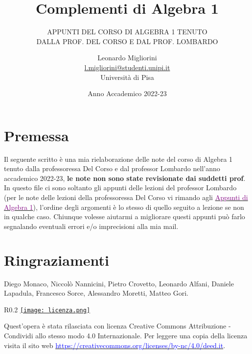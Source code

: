 \documentclass[11pt]{scrartcl}
\begin{document}
\title{Complementi di Algebra 1}
\subtitle{\large\normalfont\rmfamily\scshape APPUNTI DEL CORSO DI ALGEBRA 1 TENUTO\\ DALLA PROF. DEL CORSO E DAL PROF. LOMBARDO}
\author{Leonardo Migliorini \\ \textnormal{\href{l.migliorini@studenti.unipi.it}{l.migliorini@studenti.unipi.it}} \\ Università di Pisa}
\date{Anno Accademico 2022-23}
\maketitle
\newpage

\tableofcontents

\newpage

\section*{Premessa}
Il seguente scritto è una mia rielaborazione delle note del corso di Algebra 1 tenuto dalla professoressa Del Corso e dal professor Lombardo nell'anno accademico 
2022-23, \textbf{le note non sono state revisionate dai suddetti prof}. In questo file ci sono soltanto gli appunti delle lezioni del professor Lombardo (per
le note delle lezioni della professoressa Del Corso vi rimando agli \href{https://github.com/diego-unipi/Algebra-1}{\textcolor{purple}{Appunti di Algebra 1}}), l'ordine degli argomenti è lo stesso di quello seguito a lezione se non 
in qualche caso.
Chiunque volesse aiutarmi a migliorare questi appunti può farlo segnalando eventuali errori e/o imprecisioni alla mia mail.

\section*{Ringraziamenti}

Diego Monaco, Niccolò Nannicini, Pietro Crovetto, Leonardo Alfani, Daniele
Lapadula, Francesco Sorce, Alessandro Moretti, Matteo Gori.

\mbox{}
\vfill
\begin{wrapfigure}{R}{0.2\textwidth}
	\centering
	\href{https://creativecommons.org/licenses/by-nc/4.0/deed.it}{\texttt{[image: licenza.png]}}
\end{wrapfigure}

Quest'opera è stata rilasciata con licenza Creative Commons Attribuzione - Condividi allo stesso modo 4.0 Internazionale. Per leggere
una copia della licenza visita il sito web \href{http://creativecommons.org/licenses/by-sa/4.0/deed.it}{\textcolor{blue}{https://creativecommons.org/licenses/by-nc/4.0/deed.it}}.\\
\end{document}
